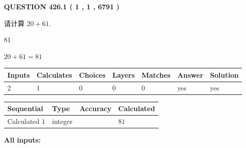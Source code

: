 \documentclass{ctexart}
\begin{document}
\vspace{0.2in}
  
{\textbf{\Large{QUESTION
426.1 
 ( 1 , 1 , 6791 )
}}}
  
  
 
请计算 $ %
20 +  %
61 $.
 
 
 
\noindent{}
 
 

81
 
 
\noindent{}
 
 

 
 
 
\noindent{}
 
 

$ %
20 +  %
61=   %
81$
 
 
\noindent{}
 
 

 
   
   
   
   
\noindent\begin{tabular}{|l|l|l|l|l|l|l|}
 \hline
Inputs & Calculates & Choices & Layers & Matches & Answer & Solution \\ \hline
 2  & 
 1  & 
 0
  & 
 0  & 
 0  & 
  yes & 
  yes 
  \\ \hline
 \end{tabular}
   
   
   
   
\noindent{}
   
   
  
  
\noindent\begin{tabular}{|l|l|l|l|}
\hline
 Sequential & Type & Accuracy & Calculated \\ 
\hline
 
 
  Calculated $  1 $ & integer &  & 
  $ 81 $ 
 \\  \hline  
 \end{tabular}
   
   
   
   
\noindent\vspace{0.1in}\hspace{-0.08in} {\textbf{\Large{All inputs: }}}
   
\end{document}
